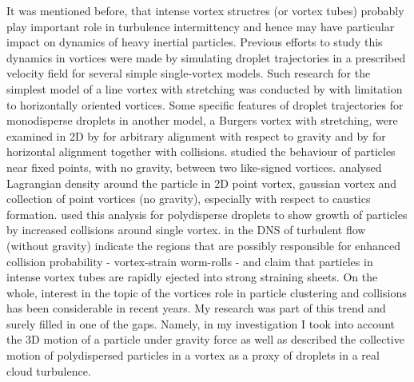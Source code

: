 \documentclass[../main.tex]{subfiles}
\begin{document}
It was mentioned before, that intense vortex structres (or vortex tubes) probably play important role in turbulence intermittency and hence may have particular impact on dynamics of heavy inertial particles. Previous efforts to study this dynamics in vortices were made by simulating droplet trajectories in a prescribed velocity field for several simple single-vortex models. Such research for the simplest model of a line vortex with stretching was conducted by \citet{Markowicz2000} with limitation to horizontally oriented vortices. Some specific features of droplet trajectories for monodisperse droplets in another model, a Burgers vortex with stretching, were examined in 2D by \citet{Marcu1995} for arbitrary alignment with respect to gravity and by \citet{Hill2005} for horizontal alignment together with collisions. \citet{Ravichandran2014} studied the behaviour of particles near fixed points, with no gravity, between two like-signed vortices. \citet{Ravichandran2015} analysed Lagrangian density around the particle in 2D point vortex, gaussian vortex and collection of point vortices (no gravity), especially with respect to caustics formation. \citep{Deepu2017} used this analysis for polydisperse droplets to show growth of particles by increased collisions around single vortex.  \citet{Picardo2019} in the DNS of turbulent flow (without gravity) indicate the regions that are possibly responsible for enhanced collision probability - vortex-strain worm-rolls - and claim that particles in intense vortex tubes are rapidly ejected into strong straining sheets. On the whole, interest in the topic of the vortices role in particle clustering and collisions has been considerable in recent years. My research was part of this trend and surely filled in one of the gaps. Namely, in my investigation I took into account the 3D motion of a particle under gravity force as well as described the collective motion of polydispersed particles in a vortex as a proxy of droplets in a real cloud turbulence.\\
\end{document}
